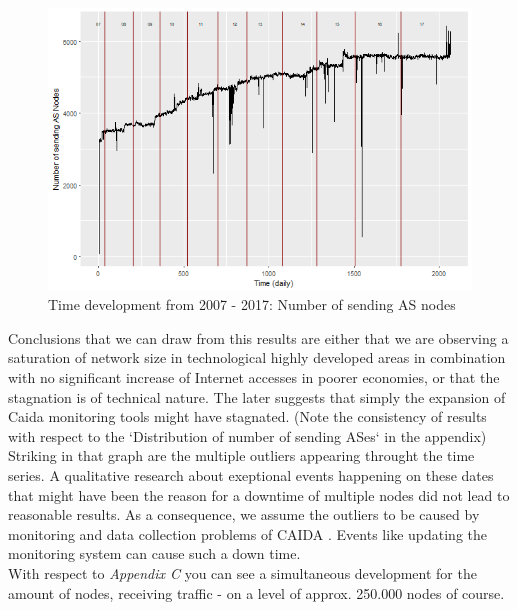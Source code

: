 \documentclass[conference, 11pt]{IEEEtran}
\begin{document}
\vspace{0.5cm}
\begin{figure}[h]
\centerline{\includegraphics[scale=0.4]{Graphics/ASFromAll.png}}
\caption{Time development from 2007 - 2017: Number of sending AS nodes}
\label{fig}
\end{figure}
\vspace{0.5cm}


Conclusions that we can draw from this results are either that we are observing a saturation of network size in technological highly developed areas in combination with no significant increase of Internet accesses in poorer economies, or that the stagnation is of technical nature. The later suggests that simply the expansion of Caida monitoring tools might have stagnated. (Note the consistency of results with respect to  the `Distribution of number of sending ASes` in the appendix) Striking in that graph are the multiple outliers appearing throught the time series. A qualitative research about exeptional events happening on these dates that might have been the reason for a downtime of multiple nodes did not lead to reasonable results. As a consequence, we assume the outliers to be caused by monitoring and data collection problems of CAIDA \cite{CaidaDataCollection}. Events like updating the monitoring system can cause such a down time. \\

With respect to \textit{Appendix C} you can see a simultaneous development for the amount of nodes, receiving traffic - on a level of approx. 250.000 nodes of course. \\ 
\end{document}
